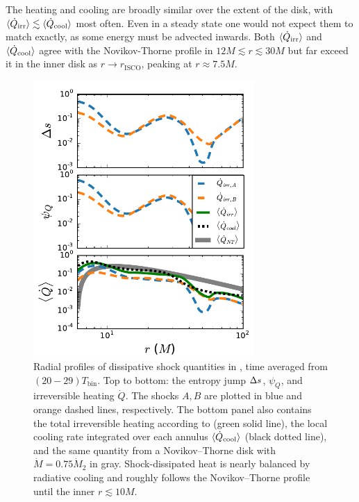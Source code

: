 The heating and cooling are broadly similar over the extent of the disk, with $\langle \dot{Q}_\text{irr} \rangle \lesssim \langle \dot{Q}_\text{cool} \rangle$ most often.  Even in a steady state one would not expect them to match exactly, as some energy must be advected inwards.  Both $\langle \dot{Q}_\text{irr} \rangle$ and $\langle \dot{Q}_\text{cool} \rangle$ agree with the Novikov-Thorne profile in $12 M \lesssim r \lesssim 30M$ but far exceed it in the inner disk as $r \to r_\text{ISCO}$, peaking at $r \approx 7.5M$.

\begin{figure}
\begin{center}
\includegraphics[width=0.75\textwidth]{figures/minidisk/q011_m3_diss_r.pdf}
\end{center}
\caption{ Radial profiles of dissipative shock quantities in , time averaged from $(20 - 29) T_\text{bin}$.  Top to bottom: the entropy jump $\Delta s$, $\psi_Q$, and irreversible heating $\dot{Q}$. The shocks $A,B$ are plotted in blue and orange dashed lines, respectively.  The bottom panel also contains the total irreversible heating according to  (green solid line), the local cooling rate integrated over each annulus $\langle \dot{Q}_\text{cool} \rangle$  (black dotted line), and the same quantity from a Novikov--Thorne disk with $\dot{M} = 0.75 \dot{M}_2$ in gray.  Shock-dissipated heat is nearly balanced by radiative cooling and roughly follows the Novikov--Thorne profile until the inner $r\lesssim 10M$.}
\end{figure}

